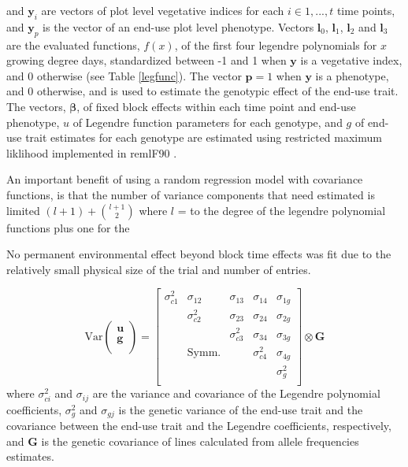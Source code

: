\documentclass[12pt, letterpaper]{article}
\begin{document}
\noindent and $\mathbf{y}_i$ are vectors of plot level vegetative indices for each $i \in {1, ..., t}$ time points, and $\mathbf{y}_p$ is the vector of an end-use plot level phenotype. Vectors $\mathbf{l}_0$, $\mathbf{l}_1$, $\mathbf{l}_2$ and $\mathbf{l}_3$ are the evaluated functions, $f(x)$, of the first four legendre polynomials for $x$ growing degree days, standardized between -1 and 1 when $\mathbf{y}$ is a vegetative index, and 0 otherwise (see Table \ref{legfunc}). The vector $\mathbf{p} = 1$ when $\mathbf{y}$ is a phenotype, and 0 otherwise, and is used to estimate the genotypic effect of the end-use trait. The vectors, $\boldsymbol \beta$, of fixed block effects within each time point and end-use phenotype, $u$ of Legendre function parameters for each genotype, and $g$ of end-use trait estimates for each genotype are estimated using restricted maximum liklihood implemented in remlF90 \parencite{misztal2002}.

An important benefit of using a random regression model with covariance functions, is that the number of variance components that need estimated is limited $(l+1) + \binom{l+1}{2}$ where $l$  = to the degree of the legendre polynomial functions plus one for the 


No permanent environmental effect beyond block time effects was fit due to the relatively small physical size of the trial and number of entries. 

\begin{equation}
 \text{Var}\begin{pmatrix}
    \mathbf{u} \\
    \mathbf{g} \\
  \end{pmatrix} = \begin{bmatrix}
    \sigma^2_{c1} & \sigma_{12} & \sigma_{13} & \sigma_{14} & \sigma_{1g} \\
     & \sigma^2_{c2} & \sigma_{23} & \sigma_{24} & \sigma_{2g} \\
     & & \sigma^2_{c3} & \sigma_{34} & \sigma_{3g} \\
     & \text{Symm.} & & \sigma^2_{c4} & \sigma_{4g} \\
     & & & & \sigma^2_{g} \\
  \end{bmatrix} \otimes \mathbf{G}
\end{equation}
\noindent where $\sigma^2_{ci}$ and $\sigma_{ij}$ are the variance and covariance of the Legendre polynomial coefficients, $\sigma^2_{g}$ and $\sigma_{gj}$ is the genetic variance of the end-use trait and the covariance between the end-use trait and the Legendre coefficients, respectively, and $\mathbf{G}$ is the genetic covariance of lines calculated from allele frequencies estimates. 
\end{document}
